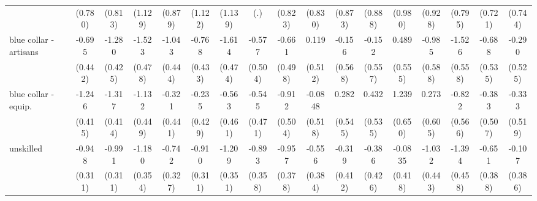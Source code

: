 {\begin{tabular}{l*{16}{c}}
                    &     (0.780)         &     (0.813)         &     (1.129)         &     (0.879)         &     (1.122)         &     (1.139)         &         (.)         &     (0.823)         &     (0.830)         &     (0.873)         &     (0.888)         &     (0.980)         &     (0.928)         &     (0.795)         &     (0.721)         &     (0.744)         \\
[1em]
blue collar - artisans&      -0.695         &      -1.280\sym{**} &      -1.523\sym{**} &      -1.043\sym{*}  &      -0.768         &      -1.614\sym{***}&      -0.577         &      -0.661         &       0.119         &      -0.156         &      -0.152         &       0.489         &      -0.985         &      -1.526\sym{**} &      -0.688         &      -0.290         \\
                    &     (0.442)         &     (0.425)         &     (0.478)         &     (0.444)         &     (0.433)         &     (0.474)         &     (0.504)         &     (0.498)         &     (0.512)         &     (0.568)         &     (0.557)         &     (0.555)         &     (0.588)         &     (0.558)         &     (0.535)         &     (0.525)         \\
[1em]
blue collar - equip.&      -1.246\sym{**} &      -1.317\sym{**} &      -1.132\sym{*}  &      -0.321         &      -0.235         &      -0.563         &      -0.545         &      -0.912         &     -0.0848         &       0.282         &       0.432         &       1.239         &       0.273         &      -0.822         &      -0.383         &      -0.333         \\
                    &     (0.415)         &     (0.414)         &     (0.449)         &     (0.441)         &     (0.429)         &     (0.461)         &     (0.471)         &     (0.504)         &     (0.518)         &     (0.545)         &     (0.535)         &     (0.650)         &     (0.605)         &     (0.566)         &     (0.507)         &     (0.519)         \\
[1em]
unskilled           &      -0.948\sym{**} &      -0.991\sym{**} &      -1.180\sym{***}&      -0.742\sym{*}  &      -0.910\sym{**} &      -1.209\sym{***}&      -0.893\sym{*}  &      -0.957\sym{*}  &      -0.556         &      -0.319         &      -0.386         &     -0.0835         &      -1.032\sym{*}  &      -1.394\sym{**} &      -0.651         &      -0.107         \\
                    &     (0.311)         &     (0.311)         &     (0.354)         &     (0.327)         &     (0.311)         &     (0.351)         &     (0.358)         &     (0.378)         &     (0.384)         &     (0.412)         &     (0.426)         &     (0.418)         &     (0.443)         &     (0.458)         &     (0.388)         &     (0.386)         \\

\end{tabular}}

